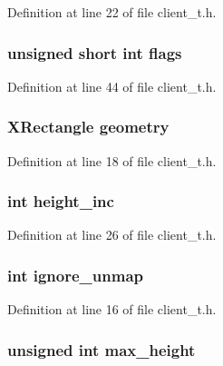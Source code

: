 Definition at line 22 of file client\_\-t.h.

\hypertarget{struct_client_ae718cba7f740adbac78a900ce25b73af}{
\subsubsection[{flags}]{\setlength{\rightskip}{0pt plus 5cm}unsigned short int {\bf flags}}}
\label{struct_client_ae718cba7f740adbac78a900ce25b73af}


Definition at line 44 of file client\_\-t.h.

\hypertarget{struct_client_aac33c74a9e108df3ab284cf3a1cc8e21}{
\subsubsection[{geometry}]{\setlength{\rightskip}{0pt plus 5cm}XRectangle {\bf geometry}}}
\label{struct_client_aac33c74a9e108df3ab284cf3a1cc8e21}


Definition at line 18 of file client\_\-t.h.

\hypertarget{struct_client_a190086fa558b76d771ec683385f0f813}{
\subsubsection[{height\_\-inc}]{\setlength{\rightskip}{0pt plus 5cm}int {\bf height\_\-inc}}}
\label{struct_client_a190086fa558b76d771ec683385f0f813}


Definition at line 26 of file client\_\-t.h.

\hypertarget{struct_client_a96f59ed442b8ebb6f55b3ddae4348692}{
\subsubsection[{ignore\_\-unmap}]{\setlength{\rightskip}{0pt plus 5cm}int {\bf ignore\_\-unmap}}}
\label{struct_client_a96f59ed442b8ebb6f55b3ddae4348692}


Definition at line 16 of file client\_\-t.h.

\hypertarget{struct_client_aa359881e928cd3f4c3386bc004a0ba94}{
\subsubsection[{max\_\-height}]{\setlength{\rightskip}{0pt plus 5cm}unsigned int {\bf max\_\-height}}}
\label{struct_client_aa359881e928cd3f4c3386bc004a0ba94}


